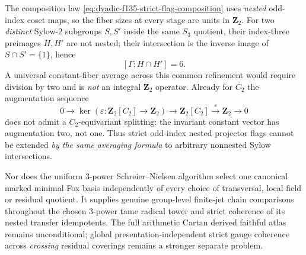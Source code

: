 \begin{warning}
\label{warn:dyadic-f135-crossing-sylow-firewall}
The composition
law
\eqref{eq:dyadic-f135-strict-flag-composition}
uses \emph{nested}
odd-index coset
maps, so the
fiber sizes
at every stage
are units in
$\mathbf Z_2$.
For two
\emph{distinct}
Sylow-$2$
subgroups
$S,S'$ inside
the same
$S_3$ quotient,
their index-three
preimages
$H,H'$ are
not nested;
their
intersection is
the inverse
image of
$S\cap S'=\{1\}$,
hence
\[
[\Gamma:H\cap H']=6.
\]
A universal
constant-fiber
average across
this common
refinement
would require
division by
two and is
\emph{not}
an integral
$\mathbf Z_2$
operator.
Already for
$C_2$ the
augmentation sequence
\[
0\to
\ker(\varepsilon:
\mathbf Z_2[C_2]\to
\mathbf Z_2)
\to
\mathbf Z_2[C_2]
\xrightarrow{\varepsilon}
\mathbf Z_2\to0
\]
does not admit a
$C_2$-equivariant
splitting:
the invariant
constant vector
has augmentation
two, not one.
Thus strict
odd-index
nested projector
flags cannot
be extended
\emph{by the same
averaging formula}
to arbitrary
nonnested
Sylow intersections.

Nor does the
uniform
$3$-power
Schreier--Nielsen
algorithm
select one
canonical
marked minimal
Fox basis
independently
of every choice
of transversal,
local field
or residual
quotient.
It supplies
genuine
group-level
finite-jet
chain
comparisons
throughout
the chosen
$3$-power
tame radical
tower and
strict
coherence of
its nested
transfer
idempotents.
The full
arithmetic
Cartan
derived
faithful atlas
remains
unconditional;
global
presentation-independent
strict
gauge coherence
across
\emph{crossing}
residual
coverings
remains a
stronger
separate
problem.
\end{warning}
